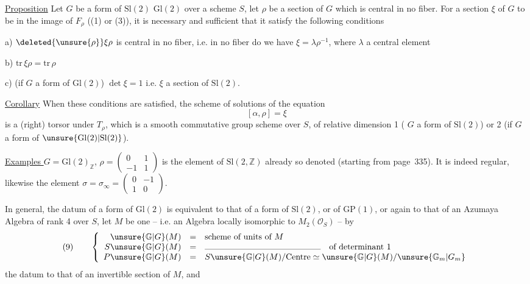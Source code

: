 \uline{Proposition} Let $G$ be a form of $\mathrm{Sl}(2)$  $\mathrm{Gl}(2)$ over a scheme $S$, let $\rho$ be a section of $G$ which is central in no fiber. For a section $\xi$ of $G$ to be  in the image of $F_\rho$ ((1) or (3)), it is necessary and sufficient that it satisfy the following conditions

a) $\deleted{\unsure{\rho}}\xi\rho$ is central in no fiber, i.e. in no fiber do we have $\xi=\lambda\rho^{-1}$, where $\lambda$  a central element

b) $\mathrm{tr}\,\xi\rho=\mathrm{tr}\,\rho$

c) (if $G$ a form of $\mathrm{Gl}(2)$) $\det\xi=1$ i.e. $\xi$ a section of $\mathrm{Sl}(2)$.


\uline{Corollary} When these conditions are satisfied, the scheme of solutions  of the equation
\[
[\alpha,\rho]=\xi
\]
is a (right) torsor under $T_\rho$, which is a smooth commutative group scheme over $S$, of relative dimension 1 ( $G$ a form of $\mathrm{Sl}(2)$) or 2 (if $G$ a form of $\unsure{\mathrm{Gl}(2)|\mathrm{Sl}(2)}$).

\uline{Examples } $G=\mathrm{Gl}(2)_{\mathbb Z}$, $\rho=\begin{pmatrix}0&1\\-1&1\end{pmatrix}$ is the element of $\mathrm{Sl}(2,\mathbb Z)$ already so denoted (starting from page~335). It is indeed regular,  likewise the element $\sigma=\sigma_\infty=\begin{pmatrix}0&-1\\1&0\end{pmatrix}$.

In general, the datum of a form of $\mathrm{Gl}(2)$ is equivalent to that of a form of $\mathrm{Sl}(2)$, or of $\mathrm{GP}(1)$, or again to that of an Azumaya Algebra of rank 4 over $S$, let $M$ be one -- i.e. an Algebra locally  isomorphic to $M_2(\mathcal O_S)$ -- by
\[
(9)\qquad
\left\{
\begin{array}{rcl}
\unsure{\mathbb G|G}(M)&=&\text{scheme of units of }M\\
S\unsure{\mathbb G|G}(M)&=&\rule{4.8cm}{0.3pt}\quad\text{of determinant }1\\
P\unsure{\mathbb G|G}(M)&=&S\unsure{\mathbb G|G}(M)/\mathrm{Centre}\simeq\unsure{\mathbb G|G}(M)/\unsure{\mathbb G_m|G_m}
\end{array}
\right.
\]
 the datum   to that of an invertible section of $M$, and

